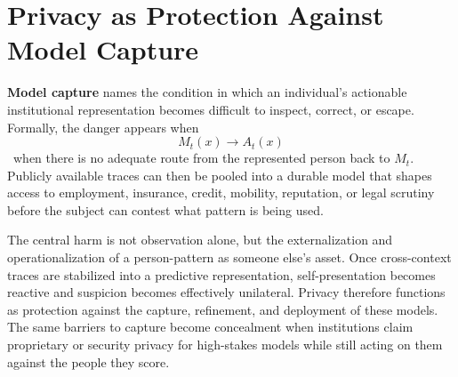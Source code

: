 
\chapter{Privacy as Protection Against Model Capture}
\label{ch:ch032}

\textbf{Model capture} names the condition in which an individual's actionable institutional representation becomes difficult to inspect, correct, or escape. Formally, the danger appears when
\[
M_t(x) \to A_t(x)
\]
\Definition\ when there is no adequate route from the represented person back to \(M_t\). Publicly available traces can then be pooled into a durable model that shapes access to employment, insurance, credit, mobility, reputation, or legal scrutiny before the subject can contest what pattern is being used.

The central harm is not observation alone, but the externalization and operationalization of a person-pattern as someone else's asset. Once cross-context traces are stabilized into a predictive representation, self-presentation becomes reactive and suspicion becomes effectively unilateral. Privacy therefore functions as protection against the capture, refinement, and deployment of these models. The same barriers to capture become concealment when institutions claim proprietary or security privacy for high-stakes models while still acting on them against the people they score.
